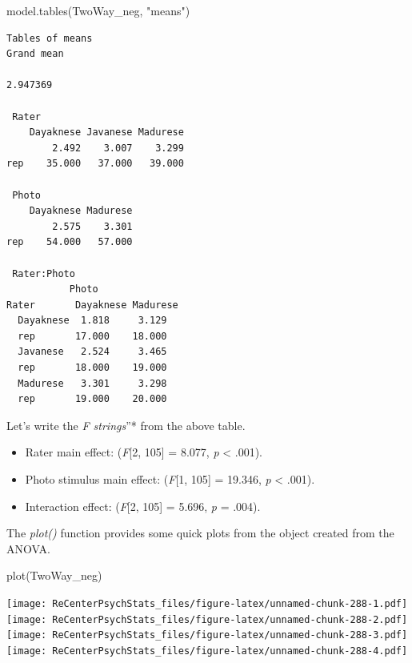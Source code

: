 \documentclass[
  11pt,
]{book}
\newenvironment{Shaded}{\begin{snugshade}}{\end{snugshade}}
\newcommand{\FunctionTok}[1]{\textcolor[rgb]{0.00,0.00,0.00}{#1}}
\newcommand{\NormalTok}[1]{#1}
\newcommand{\StringTok}[1]{\textcolor[rgb]{0.31,0.60,0.02}{#1}}
\providecommand{\tightlist}{%
  \setlength{\itemsep}{0pt}\setlength{\parskip}{0pt}}
\begin{document}
\begin{Shaded}
\begin{Highlighting}[]
\FunctionTok{model.tables}\NormalTok{(TwoWay\_neg, }\StringTok{"means"}\NormalTok{)}
\end{Highlighting}
\end{Shaded}

\begin{verbatim}
Tables of means
Grand mean
         
2.947369 

 Rater 
    Dayaknese Javanese Madurese
        2.492    3.007    3.299
rep    35.000   37.000   39.000

 Photo 
    Dayaknese Madurese
        2.575    3.301
rep    54.000   57.000

 Rater:Photo 
           Photo
Rater       Dayaknese Madurese
  Dayaknese  1.818     3.129  
  rep       17.000    18.000  
  Javanese   2.524     3.465  
  rep       18.000    19.000  
  Madurese   3.301     3.298  
  rep       19.000    20.000  
\end{verbatim}

Let's write the \emph{F strings}''* from the above table.

\begin{itemize}
\tightlist
\item
  Rater main effect: (\emph{F}{[}2, 105{]} = 8.077, \emph{p} \textless{} .001).
\item
  Photo stimulus main effect: (\emph{F}{[}1, 105{]} = 19.346, \emph{p} \textless{} .001).
\item
  Interaction effect: (\emph{F}{[}2, 105{]} = 5.696, \emph{p} = .004).
\end{itemize}

The \emph{plot()} function provides some quick plots from the object created from the ANOVA.

\begin{Shaded}
\begin{Highlighting}[]
\FunctionTok{plot}\NormalTok{(TwoWay\_neg)}
\end{Highlighting}
\end{Shaded}

\texttt{[image: ReCenterPsychStats\_files/figure-latex/unnamed-chunk-288-1.pdf]} \texttt{[image: ReCenterPsychStats\_files/figure-latex/unnamed-chunk-288-2.pdf]} \texttt{[image: ReCenterPsychStats\_files/figure-latex/unnamed-chunk-288-3.pdf]} \texttt{[image: ReCenterPsychStats\_files/figure-latex/unnamed-chunk-288-4.pdf]}
\end{document}
